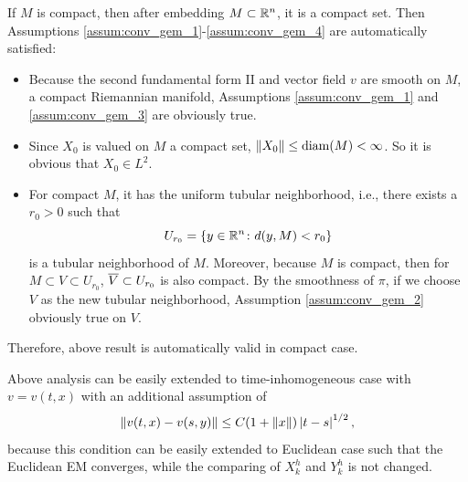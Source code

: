 \begin{rmk}
    If $M$ is compact, then after embedding $M \subset \mathbb{R}^n$, it is a compact set. Then Assumptions \ref{assum:conv_gem_1}-\ref{assum:conv_gem_4} are automatically satisfied:
    \begin{itemize}
        \item Because the second fundamental form $\mathrm{II}$ and vector field $v$ are smooth on $M$, a compact Riemannian manifold, Assumptions \ref{assum:conv_gem_1} and \ref{assum:conv_gem_3} are obviously true.
        \item Since $X_0$ is valued on $M$ a compact set, $\left\lVert X_0\right\lVert \leq \operatorname{diam}(M) < \infty$. So it is obvious that $X_0 \in L^2$.
        \item For compact $M$, it has the uniform tubular neighborhood, i.e., there exists a $r_0 > 0$ such that
        \begin{equation*}
            U_{r_0} = \left\{y \in \mathbb{R}^n \colon d(y,M) < r_0\right\}
        \end{equation*}
        is a tubular neighborhood of $M$. Moreover, because $M$ is compact, then for $M \subset V \subset U_{r_0}$, $\overline{V} \subset U_{r_0}$ is also compact. By the smoothness of $\pi$, if we choose $V$ as the new tubular neighborhood, Assumption \ref{assum:conv_gem_2} obviously true on $V$.
    \end{itemize}
    Therefore, above result is automatically valid in compact case.
\end{rmk}

\begin{rmk}
    Above analysis can be easily extended to time-inhomogeneous case with $v = v(t,x)$ with an additional assumption of
    \begin{equation*}
        \left\lVert v(t,x) - v(s,y)\right\lVert \leq C(1 + \left\lVert x\right\lVert)\left\lvert t-s\right\lvert^{1/2},
    \end{equation*}
    because this condition can be easily extended to Euclidean case such that the Euclidean EM converges, while the comparing of $X^h_k$ and $Y^h_k$ is not changed.
\end{rmk}


